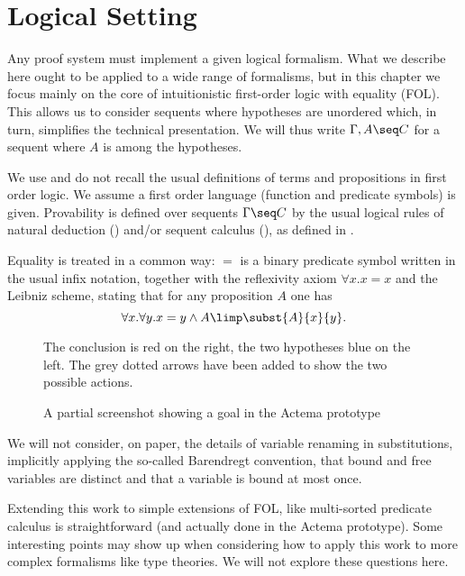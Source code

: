 
\section{Logical Setting}

Any proof system must implement a given logical formalism. What we describe here
ought to be applied to a wide range of formalisms, but in this chapter we focus
mainly on the core of intuitionistic first-order logic with equality
(FOL). This allows us to consider sequents where hypotheses are
unordered which, in turn, simplifies the technical presentation. We will thus
write $\Gamma,A \seq C$ for a sequent where $A$ is among the hypotheses.

We use and do not recall the usual definitions of terms and propositions in
first order logic. We assume a first order language (function and predicate
symbols) is given. Provability is defined over sequents $\Gamma\seq C$ by the
usual logical rules of natural deduction () and/or sequent calculus
(), as defined in .

Equality is treated in a common way: $=$ is a binary
predicate symbol written in the usual infix notation, together with the
reflexivity axiom $\forall x.x=x$ and the Leibniz scheme, stating that for any
proposition $A$ one has
$$\forall x.\forall y. x=y\land A \limp \subst{A}{x}{y}.$$

\begin{figure*}
 \begin{center}
 \end{center}
 \caption{A partial screenshot showing a goal in the Actema prototype}
 The conclusion is red on the right, the two hypotheses blue on the left. The
   grey dotted arrows have been added to show the two possible actions.
 \end{figure*}

We will not consider, on paper, the details of variable renaming in
substitutions, implicitly applying the so-called Barendregt
convention, that bound and free variables are distinct and that a
variable is bound at most once.

Extending this work to simple extensions of FOL, like multi-sorted predicate
calculus is straightforward (and actually done in the Actema prototype).  Some
interesting points may show up when considering how to apply this work to more
complex formalisms like type theories. We will not explore these questions here.

